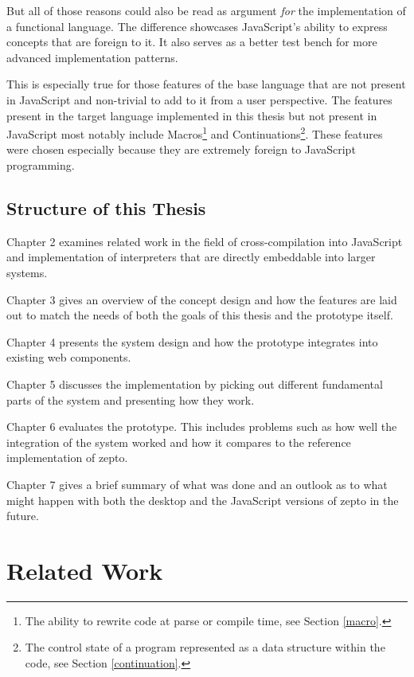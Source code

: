 \documentclass[oneside,11pt,xetex]{scrbook}
\begin{document}
But all of those reasons could also be read as argument \textit{for} the implementation
of a functional language. The difference showcases JavaScript's ability
to express concepts that are foreign to it. It also serves as a better
test bench for more advanced implementation patterns.

This is especially true for those features of the base language that are not
present in JavaScript and non-trivial to add to it from a user perspective.
The features present in the target language implemented in this thesis but not
present in JavaScript most notably include Macros\footnote{The ability to rewrite
code at parse or compile time, see Section \ref{macro}.} and Continuations\footnote{The
control state of a program represented as a data structure within the code, see
Section \ref{continuation}.}. These features were chosen especially because they are
extremely foreign to JavaScript programming.

\section{Structure of this Thesis}

Chapter 2 examines related work in the field of cross-compilation into JavaScript and implementation
of interpreters that are directly embeddable into larger systems.

Chapter 3 gives an overview of the concept design and how the features are laid out to match the needs
of both the goals of this thesis and the prototype itself.

Chapter 4 presents the system design and how the prototype integrates into existing web components.

Chapter 5 discusses the implementation by picking out different fundamental parts of the system and
presenting how they work.

Chapter 6 evaluates the prototype. This includes problems such as how well the integration of the
system worked and how it compares to the reference implementation of zepto.

Chapter 7 gives a brief summary of what was done and an outlook as to what might happen with
both the desktop and the JavaScript versions of zepto in the future.

\chapter{Related Work}
\label{chap:RelatedWork}
\end{document}

